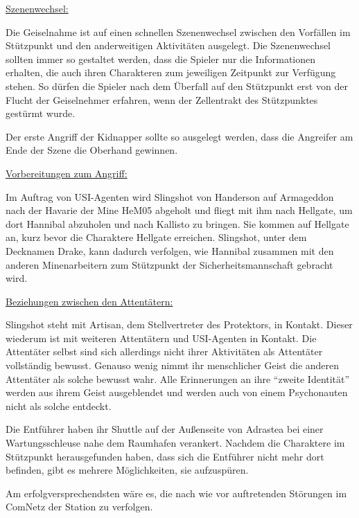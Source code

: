 \begin{remarks}
	\underline{Szenenwechsel:}

	Die Geiselnahme ist auf einen schnellen Szenenwechsel zwischen den Vorfällen im Stützpunkt und den anderweitigen Aktivitäten ausgelegt. Die Szenenwechsel sollten immer so gestaltet werden, dass die Spieler nur die Informationen erhalten, die auch ihren Charakteren zum jeweiligen Zeitpunkt zur Verfügung stehen. So dürfen die Spieler nach dem Überfall auf den Stützpunkt erst von der Flucht der Geiselnehmer erfahren, wenn der Zellentrakt des Stützpunktes gestürmt wurde.

	Der erste Angriff der Kidnapper sollte so ausgelegt werden, dass die Angreifer am Ende der Szene die Oberhand gewinnen.

	\underline{Vorbereitungen zum Angriff:}
	
	Im Auftrag von USI-Agenten wird Slingshot von Handerson auf Armageddon nach der Havarie der Mine HeM05 abgeholt und fliegt mit ihm nach Hellgate, um dort Hannibal abzuholen und nach Kallisto zu bringen. Sie kommen auf Hellgate an, kurz bevor die Charaktere Hellgate erreichen. Slingshot, unter dem Decknamen Drake, kann dadurch verfolgen, wie Hannibal zusammen mit den anderen Minenarbeitern zum Stützpunkt der Sicherheitsmannschaft gebracht wird.

	\underline{Beziehungen zwischen den Attentätern:}

	Slingshot steht mit Artisan, dem Stellvertreter des Protektors, in Kontakt. Dieser wiederum ist mit weiteren Attentätern und 
	USI-Agenten in Kontakt. Die Attentäter selbst sind sich allerdings nicht ihrer Aktivitäten als Attentäter vollständig bewusst. Genauso wenig nimmt ihr menschlicher Geist die anderen Attentäter als solche bewusst wahr. Alle Erinnerungen an ihre ``zweite Identität'' werden aus ihrem Geist ausgeblendet und werden auch von einem Psychonauten nicht als solche entdeckt.
\end{remarks}



Die Entführer haben ihr Shuttle auf der Außenseite von Adrastea bei einer Wartungsschleuse nahe dem Raumhafen verankert. Nachdem die Charaktere im Stützpunkt herausgefunden haben, dass sich die Entführer nicht mehr dort befinden, gibt es mehrere Möglichkeiten, sie aufzuspüren.

Am erfolgversprechendsten wäre es, die nach wie vor auftretenden Störungen im ComNetz der Station zu verfolgen.

